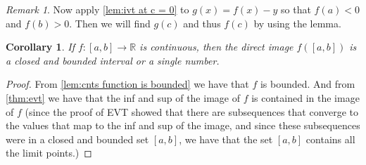 \documentclass{article}
\newtheorem{corollary}{Corollary}[section]
\theoremstyle{definition}
\theoremstyle{remark}
\newtheorem{remark}{Remark}[section]
\begin{document}
\begin{remark}
Now apply \ref{lem:ivt at c = 0} to $g(x) = f(x) - y$ so that 
$f(a) < 0$ and $f(b) > 0$. Then we will find $g(c)$ and thus $f(c)$ by using the lemma.
\end{remark}

\vspace{.5cm}


\begin{corollary}
If $f : [a, b] \to \mathbb{R}$ is continuous, then the direct image $f([a, b])$ is a closed and bounded interval or a single number.
\end{corollary}
\begin{proof}
From \ref{lem:cnts function is bounded} we have that $f$ is bounded. 
And from \ref{thm:evt} we have that the inf and sup of the image of $f$ is 
contained in the image of $f$ (since the proof of EVT showed that 
there are subsequences that converge to the values that map to the inf and sup
of the image, and since these subsequences were in a closed and bounded set $[a,b]$, we have that
the set $[a,b]$ contains all the limit points.)
\end{proof}


\vspace{.5cm}
\end{document}
